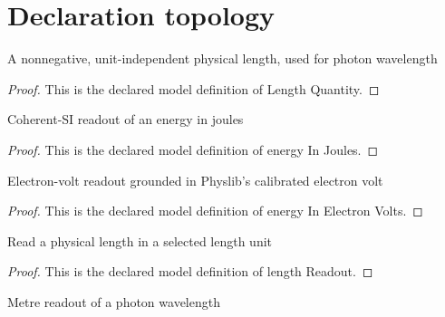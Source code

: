\section{Declaration topology}
\begin{definition}
  \label{def:physics:phyx-mini-0536:phyxminiproblems-problemphyxmini0536-lengthquantity}
  A nonnegative, unit-independent physical length, used for photon wavelength
\end{definition}
\begin{proof}
  This is the declared model definition of Length Quantity.
\end{proof}
\begin{definition}
  \label{def:physics:phyx-mini-0536:phyxminiproblems-problemphyxmini0536-energyinjoules}
  Coherent-SI readout of an energy in joules
\end{definition}
\begin{proof}
  This is the declared model definition of energy In Joules.
\end{proof}
\begin{definition}
  \label{def:physics:phyx-mini-0536:phyxminiproblems-problemphyxmini0536-energyinelectronvolts}
  Electron-volt readout grounded in Physlib's calibrated electron volt
\end{definition}
\begin{proof}
  This is the declared model definition of energy In Electron Volts.
\end{proof}
\begin{definition}
  \label{def:physics:phyx-mini-0536:phyxminiproblems-problemphyxmini0536-lengthreadout}
  Read a physical length in a selected length unit
\end{definition}
\begin{proof}
  This is the declared model definition of length Readout.
\end{proof}
\begin{definition}
  \label{def:physics:phyx-mini-0536:phyxminiproblems-problemphyxmini0536-lengthinmeters}
  Metre readout of a photon wavelength
\end{definition}
